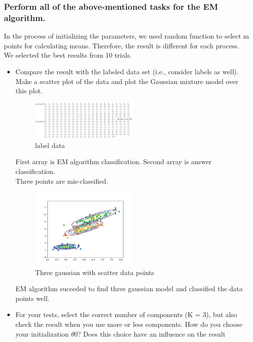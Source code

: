 \documentclass[a4paper]{article}
\begin{document}
	\subsubsection{Perform all of the above-mentioned tasks for the EM algorithm.}
	In the process of initializing the parameters, we used random function to select m points for calculating means. Therefore, the result is different for each process. We selected the best results from 10 trials.
	\begin{itemize}
	\item Compare the result with the labeled data set (i.e., consider labels as well). Make a scatter plot of the data and plot the Gaussian mixture model over this plot.

	\begin{figure}[h]
		\begin{center}
			\includegraphics[width=0.5\textwidth]{number_diff.png}
			\caption{label data}
		\end{center}
	\end{figure}
	First array is EM algorithm classification. Second array is answer classification.\\
	Three points are mis-classified.

	\begin{figure}[h]
		\begin{center}
			\includegraphics[width=0.5\textwidth]{gauss.png}
			\caption{Three gaussian with scatter data points}
		\end{center}
	\end{figure}

	EM algorithm suceeded to find three gaussian model and classified the data points well.

	\clearpage
	\item For your tests, select the correct number of components (K = 3), but also check the result when you use more or less components. How do you choose your initialization $\theta$0? Does this choice have an inﬂuence on the result


\end{itemize}
\end{document}
